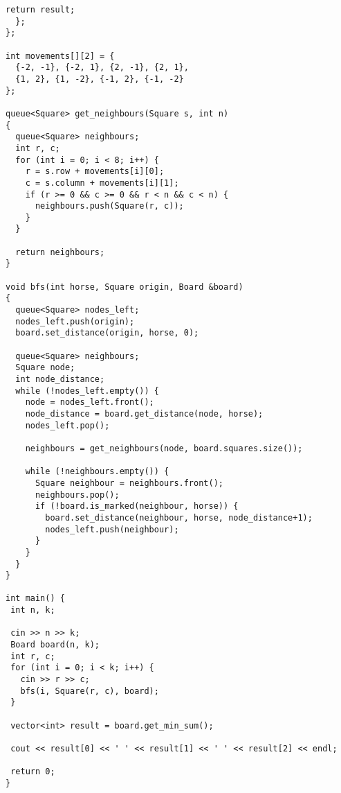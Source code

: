 \begin{lstlisting}[frame=single]
    return result;
  };
};

int movements[][2] = {
  {-2, -1}, {-2, 1}, {2, -1}, {2, 1},
  {1, 2}, {1, -2}, {-1, 2}, {-1, -2}
};

queue<Square> get_neighbours(Square s, int n)
{
  queue<Square> neighbours;
  int r, c;
  for (int i = 0; i < 8; i++) {
    r = s.row + movements[i][0];
    c = s.column + movements[i][1];
    if (r >= 0 && c >= 0 && r < n && c < n) {
      neighbours.push(Square(r, c));
    }
  }

  return neighbours;
}

void bfs(int horse, Square origin, Board &board)
{
  queue<Square> nodes_left;
  nodes_left.push(origin);
  board.set_distance(origin, horse, 0);

  queue<Square> neighbours;
  Square node;
  int node_distance;
  while (!nodes_left.empty()) {
    node = nodes_left.front();
    node_distance = board.get_distance(node, horse);
    nodes_left.pop();

    neighbours = get_neighbours(node, board.squares.size());

    while (!neighbours.empty()) {
      Square neighbour = neighbours.front();
      neighbours.pop();
      if (!board.is_marked(neighbour, horse)) {
        board.set_distance(neighbour, horse, node_distance+1); 
        nodes_left.push(neighbour);
      }
    }
  }
}

int main() {
 int n, k;

 cin >> n >> k;
 Board board(n, k);
 int r, c;
 for (int i = 0; i < k; i++) {
   cin >> r >> c;
   bfs(i, Square(r, c), board);
 }

 vector<int> result = board.get_min_sum();

 cout << result[0] << ' ' << result[1] << ' ' << result[2] << endl;

 return 0;
}
\end{lstlisting}

